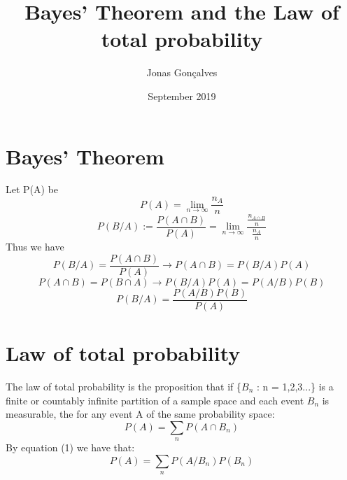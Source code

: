 \documentclass{article}
\title{Bayes' Theorem and the Law of total probability}
\author{Jonas Gonçalves}
\date{September 2019}
\begin{document}
\maketitle

\section{Bayes' Theorem}
Let P(A) be
\[P(A) = \lim_{n \rightarrow \infty} \frac{n_A}{n}\]
\[P(B/A) := \frac{P(A\cap B)}{P(A)} = \lim_{n \to \infty} \frac{\frac{n_{A \cap B}}{n}}{\frac{n_A}{n}}\]
Thus we have
\begin{equation}
P(B/A) = \frac{P(A\cap B)}{P(A)} \to P(A\cap B) = P(B/A)P(A)
\end{equation}{}
\[P(A \cap B) = P(B \cap A) \to P(B/A)P(A) = P(A/B)P(B)\]
\begin{equation}
    P(B/A) = \frac{P(A/B)P(B)}{P(A)}
\end{equation}
\section{Law of total probability}
The law of total probability is the proposition that if \{\(B_n\) : n = 1,2,3...\} is a finite or countably infinite partition of a sample space and each event \(B_n\) is measurable, the for any event A of the same probability space:
\[P(A) = \sum_{n} P(A \cap B_n)\]
By equation (1) we have that:
\begin{equation}
P(A) = \sum_{n} P(A/B_n)P(B_n)
\end{equation}
\end{document}
